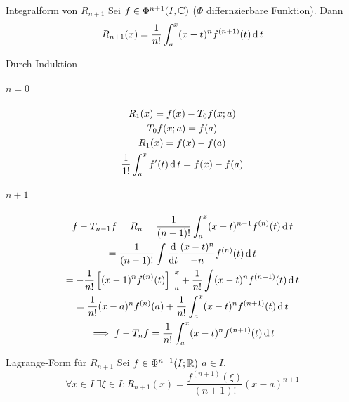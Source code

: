 \begin{Sat}{Integralform von $R_{n+1}$}
  Sei $f\in \Phi^{n+1}(I,\mathbb{C})$ ($\Phi$ differnzierbare Funktion). Dann
  \[R_{n+1}(x)=\frac{1}{n!}\int_a^x(x-t)^nf^{(n+1)}(t)\operatorname{d} t\]
\end{Sat}
\begin{Bew}
  Durch Induktion
  \subparagraph{$n=0$}
  \begin{gather*}
    R_1(x)=f(x)-T_0f(x;a)\\
    T_0f(x;a)=f(a)\\
    R_1(x)=f(x)-f(a)\\
    \frac{1}{1!}\int^x_af'(t)\operatorname{d} t=f(x)-f(a)
  \end{gather*}
  \subparagraph{$n+1$}
  \begin{gather*}
    f-T_{n-1} f=R_n=\frac{1}{(n-1)!}\int^x_a(x-t)^{n-1}f^{(n)}(t)\operatorname{d} t\\
    =\frac{1}{(n-1)!}\int\displaystyle\frac{\mathrm{d}}{\mathrm{d}t}\frac{(x-t)^n}{-n}f^{(n)}(t)\operatorname{d} t\\
    =-\frac{1}{n!}\left[ (x-1)^nf^{(n)}(t) \right]\Big|^x_a+\frac{1}{n!}\int(x-t)^nf^{(n+1)}(t)\operatorname{d} t\\
    =\frac{1}{n!}(x-a)^nf^{(n)}(a)+\frac{1}{n!}\int^x_a(x-t)^nf^{(n+1)}(t)\operatorname{d} t\\
    \implies f-T_nf=\frac{1}{n!}\int^x_a(x-t)^nf^{(n+1)}(t)\operatorname{d} t
  \end{gather*}
\end{Bew}
\begin{Kor}{Lagrange-Form für $R_{n+1}$}
  Sei $f\in\Phi^{n+1}(I;\mathbb{R})$ $a\in I$.
  \[\forall x\in I\ \exists \xi\in I: R_{n+1}(x)=\frac{f^{(n+1)}(\xi)}{(n+1)!}(x-a)^{n+1}\]
\end{Kor}
